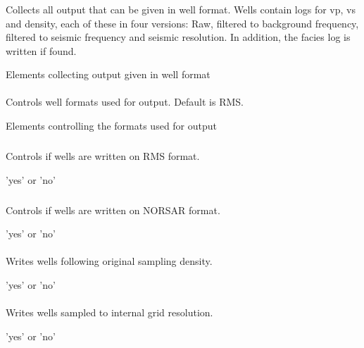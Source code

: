 \subsubsection{}
 \slist
   \item \Description Collects all output that can be given in well format. Wells contain logs for vp, vs and density, each of these in four versions: Raw, filtered to background frequency, filtered to seismic frequency and seismic resolution. In addition, the facies log is written if found.
   \item \Argument Elements collecting output given in well format
   \item \Default
 \elist

\paragraph{}
 \slist
   \item \Description Controls well formats used for output. Default is RMS.
   \item \Argument Elements controlling the formats used for output
   \item \Default
 \elist

\subparagraph{}
 \slist
   \item \Description Controls if wells are written on RMS format.
   \item \Argument 'yes' or 'no'
   \item \Default
 \elist

 \subparagraph{}
 \slist
   \item \Description Controls if wells are written on NORSAR format.
   \item \Argument 'yes' or 'no'
   \item \Default
 \elist

\paragraph{}
 \slist
   \item \Description Writes wells following original sampling density.
   \item \Argument 'yes' or 'no'
   \item \Default
 \elist

\paragraph{}
 \slist
   \item \Description Writes wells sampled to internal grid resolution.
   \item \Argument 'yes' or 'no'
   \item \Default
 \elist

